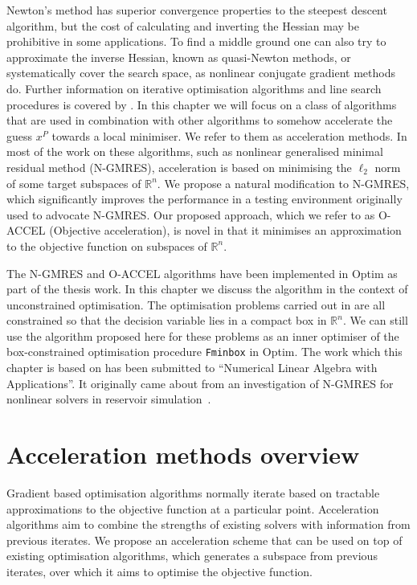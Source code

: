 \documentclass[main.tex]{subfiles}
\begin{document}
Newton's method has superior convergence properties to the steepest
descent algorithm, but the cost of calculating and inverting the
Hessian may be prohibitive in some applications.  To find a middle
ground one can also try to approximate the inverse Hessian, known as
quasi-Newton methods, or systematically cover the search space,
as nonlinear conjugate gradient methods do.  Further information on
iterative optimisation algorithms and line search procedures is covered by
\citet{nocedal2006numerical}.  In this chapter we will focus on a
class of algorithms that are used in combination with other algorithms
to somehow accelerate the guess $x^P$ towards a local minimiser.  We
refer to them as acceleration methods.  In most of the work on these
algorithms, such as nonlinear generalised minimal residual method
(N-GMRES), acceleration is based on minimising the $\ell_2$ norm of
some target subspaces of $\mathbb{R}^n$.  We propose a natural
modification to N-GMRES, which significantly improves the performance
in a testing environment originally used to advocate N-GMRES.  Our
proposed approach, which we refer to as O-ACCEL (Objective
acceleration), is novel in that it minimises an approximation to the
objective function on subspaces of $\mathbb{R}^n$.


The N-GMRES and O-ACCEL algorithms have been implemented in
Optim \citep{mogensen2018optim} as part of the thesis work. In this
chapter we discuss the algorithm in the context of unconstrained
optimisation. The optimisation problems carried out in
 are all
constrained so that the decision variable lies in a compact box in
$\mathbb{R}^n$. We can still use the algorithm proposed here for these
problems as an inner optimiser of the box-constrained optimisation
procedure \texttt{Fminbox} in Optim.  The work which this chapter is
based on has been submitted to ``Numerical Linear Algebra with
Applications''. It originally came about
from an investigation of N-GMRES for nonlinear solvers in reservoir
simulation~\citep{riseth2015nonlinear}.


\section{Acceleration methods overview}
Gradient based optimisation algorithms normally iterate based on
tractable approximations to the objective function at a particular
point.
Acceleration algorithms aim to combine the strengths of existing
solvers with information from previous iterates.  We propose an
acceleration scheme that can be used on top of existing optimisation
algorithms, which generates a subspace from previous iterates, over
which it aims to optimise the objective function.
\end{document}
